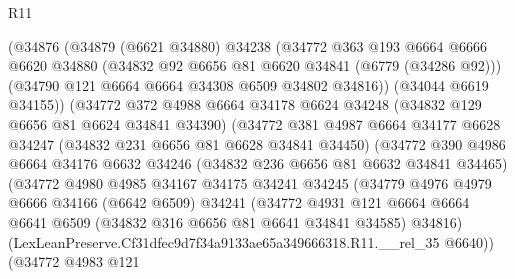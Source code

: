 \begin{lexlean}{R11}
\begin{coremodule}
                    (@34876
                      (@34879
                        (@6621 @34880)
                        @34238
                        (@34772
                          @363
                          @193
                          @6664
                          @6666
                          @6620
                          @34880
                          (@34832 @92 @6656 @81 @6620 @34841 (@6779 (@34286 @92)))
                          (@34790 @121 @6664 @6664 @34308 @6509 @34802 @34816))
                        (@34044 @6619 @34155))
                      (@34772
                        @372
                        @4988
                        @6664
                        @34178
                        @6624
                        @34248
                        (@34832 @129 @6656 @81 @6624 @34841 @34390)
                        (@34772
                          @381
                          @4987
                          @6664
                          @34177
                          @6628
                          @34247
                          (@34832 @231 @6656 @81 @6628 @34841 @34450)
                          (@34772
                            @390
                            @4986
                            @6664
                            @34176
                            @6632
                            @34246
                            (@34832 @236 @6656 @81 @6632 @34841 @34465)
                            (@34772
                              @4980
                              @4985
                              @34167
                              @34175
                              @34241
                              @34245
                              (@34779
                                @4976
                                @4979
                                @6666
                                @34166
                                (@6642 @6509)
                                @34241
                                (@34772
                                  @4931
                                  @121
                                  @6664
                                  @6664
                                  @6641
                                  @6509
                                  (@34832 @316 @6656 @81 @6641 @34841 @34585)
                                  @34816)
                                (LexLeanPreserve.Cf31dfec9d7f34a9133ae65a349666318.R11.__rel_35
                                  @6640))
                              (@34772
                                @4983
                                @121

\end{coremodule}
\end{lexlean}
